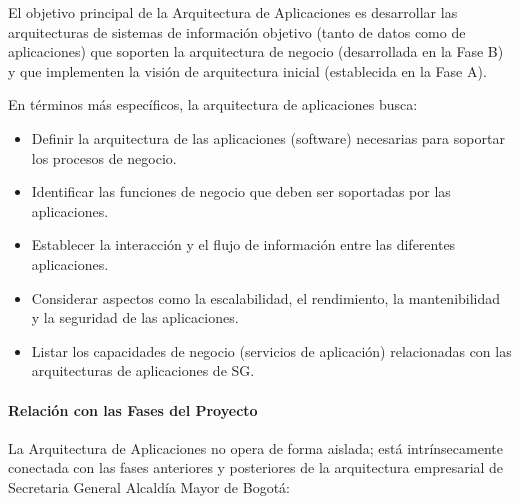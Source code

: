 \documentclass[
	a4paper, %
	12pt, %
]{include/CSSullivanBusinessReport}
\def\tightlist{}
\begin{document}
El objetivo principal de la Arquitectura de Aplicaciones es desarrollar
las arquitecturas de sistemas de información objetivo (tanto de datos
como de aplicaciones) que soporten la arquitectura de negocio
(desarrollada en la Fase B) y que implementen la visión de arquitectura
inicial (establecida en la Fase A).

En términos más específicos, la arquitectura de aplicaciones busca:

\begin{itemize}
\tightlist
\item
  Definir la arquitectura de las aplicaciones (software) necesarias para
  soportar los procesos de negocio.
\item
  Identificar las funciones de negocio que deben ser soportadas por las
  aplicaciones.
\item
  Establecer la interacción y el flujo de información entre las
  diferentes aplicaciones.
\item
  Considerar aspectos como la escalabilidad, el rendimiento, la
  mantenibilidad y la seguridad de las aplicaciones.
\item
  Listar los capacidades de negocio (servicios de aplicación)
  relacionadas con las arquitecturas de aplicaciones de SG.
\end{itemize}

\paragraph{Relación con las Fases del
Proyecto}\label{sec:relaciuxf3n-con-las-fases-del-proyecto}

La Arquitectura de Aplicaciones no opera de forma aislada; está
intrínsecamente conectada con las fases anteriores y posteriores de la
arquitectura empresarial de Secretaria General Alcaldía Mayor de Bogotá:
\end{document}
